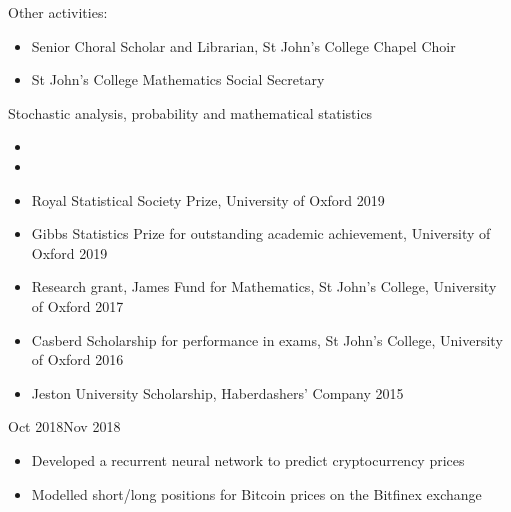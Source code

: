 \documentclass[
  date,
  number,
]{wgu-cv}
\begin{document}
Other activities:

\begin{itemize}
	\item Senior Choral Scholar and Librarian, St John's College Chapel Choir
	\item St John's College Mathematics Social Secretary
\end{itemize}



Stochastic analysis, probability and mathematical statistics



\begin{itemize}
	\item {}
	\item {}
\end{itemize}



\begin{itemize}
    \item Royal Statistical Society Prize,
      University of Oxford \hfill 2019%
    \item Gibbs Statistics Prize for outstanding academic achievement,
      University of Oxford \hfill 2019%
	\item Research grant, James Fund for Mathematics,
      St John's College, University of Oxford \hfill 2017%
	\item Casberd Scholarship for performance in exams,
      St John's College, University of Oxford \hfill 2016%
    \item Jeston University Scholarship,
      Haberdashers' Company \hfill 2015%
\end{itemize}

\pagebreak



{}
{Oct 2018}{Nov 2018}

\begin{itemize}
	\item Developed a recurrent neural network to predict cryptocurrency prices
	\item Modelled short/long positions for Bitcoin prices on the Bitfinex exchange
\end{itemize}
\end{document}
